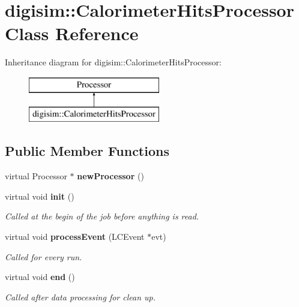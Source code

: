 \section{digisim\-:\-:Calorimeter\-Hits\-Processor Class Reference}
\label{classdigisim_1_1CalorimeterHitsProcessor}
Inheritance diagram for digisim\-:\-:Calorimeter\-Hits\-Processor\-:\begin{figure}[H]
\begin{center}
\leavevmode
\includegraphics[height=2.000000cm]{classdigisim_1_1CalorimeterHitsProcessor}
\end{center}
\end{figure}
\subsection*{Public Member Functions}
\begin{DoxyCompactItemize}
\item 
virtual Processor $\ast$ {\bfseries new\-Processor} ()\label{classdigisim_1_1CalorimeterHitsProcessor_abf3f9e4ed0166c8ef1104708ed06260c}

\item 
virtual void {\bf init} ()
\begin{DoxyCompactList}\small\item\em Called at the begin of the job before anything is read. \end{DoxyCompactList}\item 
virtual void {\bf process\-Event} (L\-C\-Event $\ast$evt)
\begin{DoxyCompactList}\small\item\em Called for every run. \end{DoxyCompactList}\item 
virtual void {\bf end} ()\label{classdigisim_1_1CalorimeterHitsProcessor_ab6c5052db5b790dfed45d26255bb2b71}

\begin{DoxyCompactList}\small\item\em Called after data processing for clean up. \end{DoxyCompactList}\end{DoxyCompactItemize}
